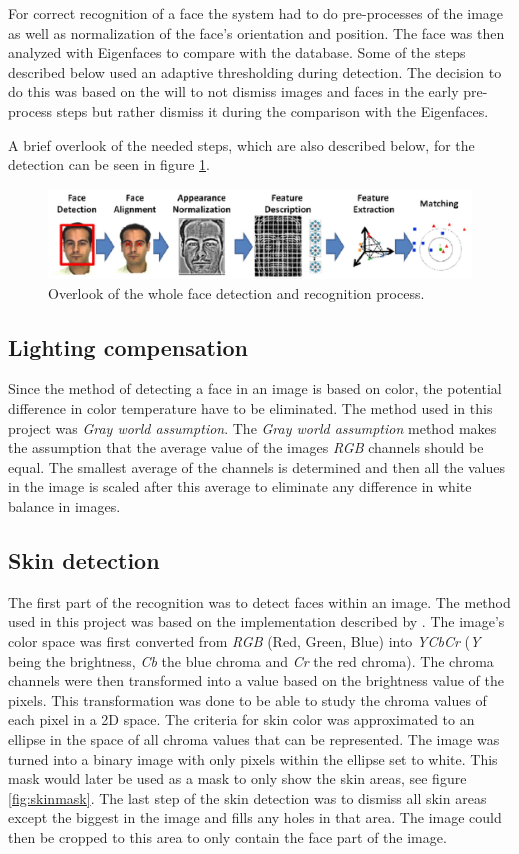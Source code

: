 For correct recognition of a face the system had to do pre-processes of the
image as well as normalization of the face’s orientation and position. The
face was then analyzed with Eigenfaces to compare with the database. Some of
the steps described below used an adaptive thresholding during detection. The
decision to do this was based on the will to not dismiss images and faces in
the early pre-process steps but rather dismiss it during the comparison with
the Eigenfaces.

A brief overlook of the needed steps, which are also described below, for the detection can be seen in figure \ref{fig:overlook}.

\begin{figure}[htbp]
  \centering
  \includegraphics[width=\columnwidth]{images/process.jpg}
  \caption{Overlook of the whole face detection and recognition process.}
  \label{fig:overlook}
\end{figure}

\subsection{Lighting compensation}
Since the method of detecting a face in an image is based on color, the
potential difference in color temperature have to be eliminated. The method
used in this project was \emph{Gray world assumption}. The \emph{Gray world
assumption} method makes the assumption that the average value of the images
\emph{RGB} channels should be equal. The smallest average of the channels is
determined and then all the values in the image is scaled after this average
to eliminate any difference in white balance in images.

\subsection{Skin detection}
The first part of the recognition was to detect faces within an image. The
method used in this project was based on the implementation described by
\cite{facedetection}. The image’s color space was first converted from \emph{RGB} (Red,
Green, Blue) into \emph{YCbCr} (\emph{Y} being the brightness, \emph{Cb} the
blue chroma and \emph{Cr} the red chroma). The chroma channels were then
transformed into a value based on the brightness value of the pixels. This
transformation was done to be able to study the chroma values of each pixel in
a 2D space. The criteria for skin color was approximated to an ellipse in the
space of all chroma values that can be represented. The image was turned into
a binary image with only pixels within the ellipse set to white. This mask
would later be used as a mask to only show the skin areas, see figure \ref{fig:skinmask}. The last step of the skin detection was to dismiss all skin areas
except the biggest in the image and fills any holes in that area. The image
could then be cropped to this area to only contain the face part of the image.


